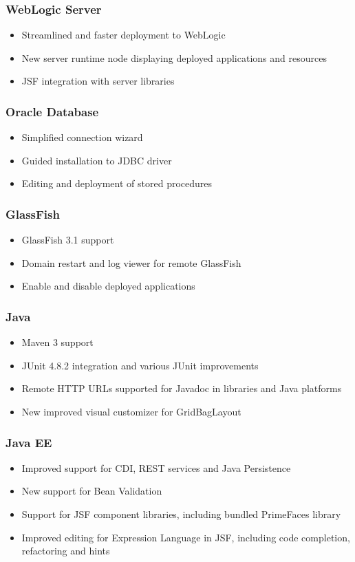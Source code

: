 \subsubsection{WebLogic Server}
\begin{itemize}
\item Streamlined and faster deployment to WebLogic
\item New server runtime node displaying deployed applications and resources
\item JSF integration with server libraries
\end{itemize}
\subsubsection{Oracle Database}
\begin{itemize}
\item Simplified connection wizard
\item Guided installation to JDBC driver
\item Editing and deployment of stored procedures
\end{itemize}
\subsubsection{GlassFish}
\begin{itemize}
\item GlassFish 3.1 support
\item Domain restart and log viewer for remote GlassFish
\item Enable and disable deployed applications
\end{itemize}
\subsubsection{Java}
\begin{itemize}
\item Maven 3 support
\item JUnit 4.8.2 integration and various JUnit improvements
\item Remote HTTP URLs supported for Javadoc in libraries and Java platforms
\item New improved visual customizer for GridBagLayout
\end{itemize}
\subsubsection{Java EE}
\begin{itemize}
\item Improved support for CDI, REST services and Java Persistence
\item New support for Bean Validation
\item Support for JSF component libraries, including bundled PrimeFaces library
\item Improved editing for Expression Language in JSF, including code completion, refactoring and hints
\end{itemize}

